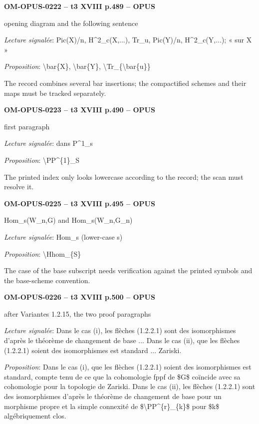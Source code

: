 \par\noindent\textbf{OM-OPUS-0222 -- t3 XVIII p.489 -- OPUS}\par
opening diagram and the following sentence\par
\emph{Lecture signalée}: Pic(X)/n, H\textasciicircum{}2\_c(X,...), Tr\_u, Pic(Y)/n, H\textasciicircum{}2\_c(Y,...); « sur X »\par
\emph{Proposition}: \textbackslash{}bar\{X\}, \textbackslash{}bar\{Y\}, \textbackslash{}Tr\_\{\textbackslash{}bar\{u\}\}\par
The record combines several bar insertions; the compactified schemes and their maps must be tracked separately.\par
\par\noindent\textbf{OM-OPUS-0223 -- t3 XVIII p.490 -- OPUS}\par
first paragraph\par
\emph{Lecture signalée}: dans P\textasciicircum{}1\_s\par
\emph{Proposition}: \textbackslash{}PP\textasciicircum{}\{1\}\_S\par
The printed index only looks lowercase according to the record; the scan must resolve it.\par
\par\noindent\textbf{OM-OPUS-0225 -- t3 XVIII p.495 -- OPUS}\par
Hom\_s(W\_n,G) and Hom\_s(W\_n,G\_n)\par
\emph{Lecture signalée}: Hom\_s (lower-case s)\par
\emph{Proposition}: \textbackslash{}Hhom\_\{S\}\par
The case of the base subscript needs verification against the printed symbols and the base-scheme convention.\par
\par\noindent\textbf{OM-OPUS-0226 -- t3 XVIII p.500 -- OPUS}\par
after Variantes 1.2.15, the two proof paragraphs\par
\emph{Lecture signalée}: Dans le cas (i), les flèches (1.2.2.1) sont des isomorphismes d'après le théorème de changement de base ... Dans le cas (ii), que les flèches (1.2.2.1) soient des isomorphismes est standard ... Zariski.\par
\emph{Proposition}: Dans le cas (i), que les flèches (1.2.2.1) soient des isomorphismes est standard, compte tenu de ce que la cohomologie fppf de \$G\$ coïncide avec sa cohomologie pour la topologie de Zariski. Dans le cas (ii), les flèches (1.2.2.1) sont des isomorphismes d'après le théorème de changement de base pour un morphisme propre et la simple connexité de \$\textbackslash{}PP\textasciicircum{}\{r\}\_\{k\}\$ pour \$k\$ algébriquement clos.\par
